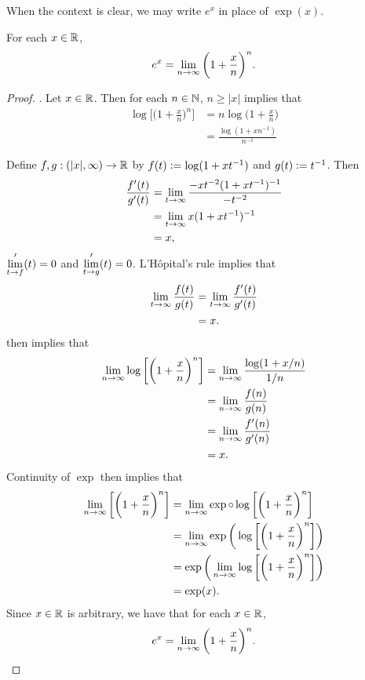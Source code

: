 \documentclass{book}
\begin{document}
	\begin{note}
		When the context is clear, we may write $e^x$ in place of $\exp(x)$. 
	\end{note}
	
	\begin{ex}
		For each $x \in \mathbb{R}$, 
		$$e^x = \lim \limits_{n \rightarrow \infty} \bigg(1 + \frac{x}{n} \bigg)^n.$$
	\end{ex}
	
	\begin{proof} .
		Let $x \in \mathbb{R}$. Then for each $n \in \mathbb{N}$, $n \geq |x|$ implies that
		\begin{align*}
			\log \bigg[ \bigg(1 + \frac{x}{n} \bigg)^n \bigg] 
			& = n \log \bigg(1 + \frac{x}{n} \bigg) \\
			& = \frac{\log (1 + xn^{-1} )}{n^{-1}}
		\end{align*}
		
		Define $f,g: (|x|, \infty) \rightarrow \mathbb{R}$ by $f(t) \vcentcolon= \log (1 + xt^{-1} )$ and $g(t) \vcentcolon= t^{-1}$. Then 
		\begin{align*}
			\frac{f'(t) }{g'(t)}
			& = \lim \limits_{t \rightarrow \infty} \frac{-xt^{-2}(1 + xt^{-1})^{-1}}{-t^{-2}} \\
			& = \lim \limits_{t \rightarrow \infty} x(1 + xt^{-1})^{-1} \\
			& = x, 
		\end{align*}
		$\lim \limits_{t \rightarrow f}'(t) = 0$ and $\lim \limits_{t \rightarrow g}'(t) = 0$. L'H\^opital's rule  implies that
		\begin{align*}
			\lim \limits_{t \rightarrow \infty} \frac{f(t)}{g(t)}
			& = \lim \limits_{t \rightarrow \infty} \frac{f'(t)}{g'(t)} \\
			& = x.
		\end{align*}
		\rex{}  then implies that 
		\begin{align*}
			\lim \limits_{n \rightarrow \infty} \log \bigg[ \bigg(1 + \frac{x}{n} \bigg)^n \bigg] 
			& = \lim \limits_{n \rightarrow \infty} \frac{\log (1 + x/n )}{1/n} \\
			& = \lim \limits_{n \rightarrow \infty} \frac{f(n)}{g(n)} \\
			& = \lim \limits_{n \rightarrow \infty} \frac{f'(n)}{g'(n)} \\
			& = x.
		\end{align*} 
		Continuity of $\exp$ then implies that 
		\begin{align*}
			\lim \limits_{n \rightarrow \infty} \bigg[ \bigg(1 + \frac{x}{n} \bigg)^n \bigg] 
			& = \lim \limits_{n \rightarrow \infty} \exp \circ \log \bigg[ \bigg(1 + \frac{x}{n} \bigg)^n \bigg] \\
			& = \lim \limits_{n \rightarrow \infty} \exp \bigg( \log \bigg[ \bigg(1 + \frac{x}{n} \bigg)^n \bigg] \bigg) \\
			& = \exp \bigg( \lim \limits_{n \rightarrow \infty} \log \bigg[ \bigg(1 + \frac{x}{n} \bigg)^n \bigg] \bigg) \\
			& = \exp(x).
		\end{align*}
		Since $x \in \mathbb{R}$ is arbitrary, we have that for each $x \in \mathbb{R}$, 
		$$e^x = \lim \limits_{n \rightarrow \infty} \bigg(1 + \frac{x}{n} \bigg)^n.$$
	\end{proof}
	
\end{document}
